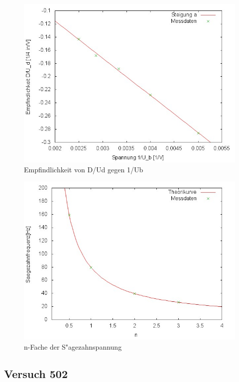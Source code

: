 		

		\begin{figure}[h]
			\centering
			\includegraphics[width = 12cm]{img/501a.jpg}
			\caption{Empfindlichkeit von D/Ud gegen 1/Ub}
			\label{501a}
		\end{figure}

		

		\begin{figure}[htbp]
			\centering
			\includegraphics[width = 12cm]{img/501b.jpg}
			\caption{n-Fache der S"agezahnspannung}
			\label{501b}
		\end{figure}

		\newpage

	\subsection{Versuch 502} %
	\label{sub:versuch_502}
		
